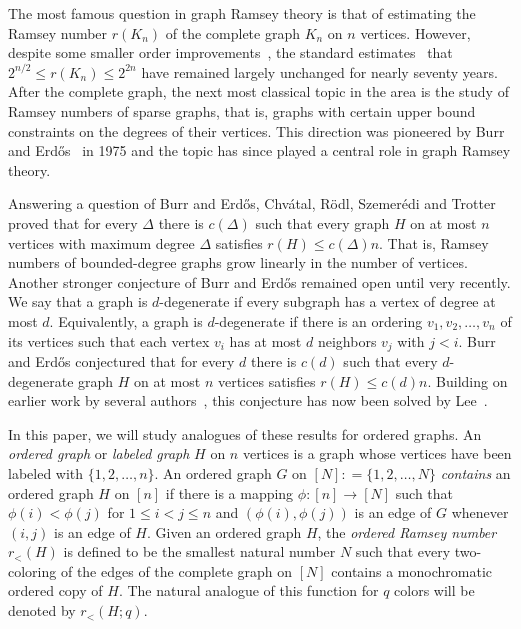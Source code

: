 \documentclass[11pt]{article}
\newcommand{\rord}{r_{<}}
\begin{document}
The most famous question in graph Ramsey theory is that of estimating the Ramsey number $r(K_n)$ of the complete graph $K_n$ on $n$ vertices. However, despite some smaller order improvements~\cite{C09, S75}, the standard estimates~\cite{E47, ES35} that $2^{n/2} \leq r(K_n) \leq 2^{2n}$ have remained largely unchanged for nearly seventy years. After the complete graph, the next most classical topic in the area is the study of Ramsey numbers of sparse graphs, that is, graphs with certain upper bound constraints on the degrees of their vertices. This direction was pioneered by Burr and Erd\H{o}s~\cite{BE75} in 1975 and the topic has since played a central role in graph Ramsey theory. 

Answering a question of Burr and Erd\H{o}s, Chv\'atal, R\"odl, Szemer\'edi and Trotter \cite{CRST83} proved that for every $\Delta$ there is $c(\Delta)$ such that every graph $H$ on at most $n$ vertices with maximum degree $\Delta$ satisfies $r(H) \leq c(\Delta)n$. That is, Ramsey numbers of bounded-degree graphs grow linearly in the number of vertices. Another stronger conjecture of Burr and Erd\H{o}s remained open until very recently. We say that a graph is $d$-degenerate if every subgraph has a vertex of degree at most $d$. Equivalently, a graph is $d$-degenerate if there is an ordering $v_1, v_2, \ldots,v_n$ of its vertices such that each vertex $v_i$ has at most $d$ neighbors $v_j$ with $j<i$. Burr and Erd\H{o}s conjectured that for every $d$ there is $c(d)$ such that every $d$-degenerate graph $H$ on at most $n$ vertices satisfies $r(H) \leq c(d)n$. Building on earlier work by several authors~\cite{AKS03, FS09, FS092, KR04, KS03}, this conjecture has now been solved by Lee~\cite{L15}.

 
In this paper, we will study analogues of these results for ordered graphs. An {\it ordered graph} or {\it labeled graph} $H$ on $n$ vertices is a graph whose vertices have been labeled with $\{1, 2, \dots, n\}$. An ordered graph $G$ on $[N] : = \{1, 2, \dots, N\}$ {\it contains} an ordered graph $H$ on $[n]$ if there is a mapping $\phi:[n] \rightarrow [N]$ such that $\phi(i)<\phi(j)$ for $1 \leq i < j \leq n$ and $(\phi(i),\phi(j))$ is an edge of $G$ whenever $(i,j)$ is an edge of $H$. Given an ordered graph $H$, the {\it ordered Ramsey number} $\rord (H)$ is defined to be the smallest natural number $N$ such that every two-coloring of the edges of the complete graph on $[N]$ contains a monochromatic ordered copy of $H$. The natural analogue of this function for $q$ colors will be denoted by $\rord(H ; q)$.
\end{document}
